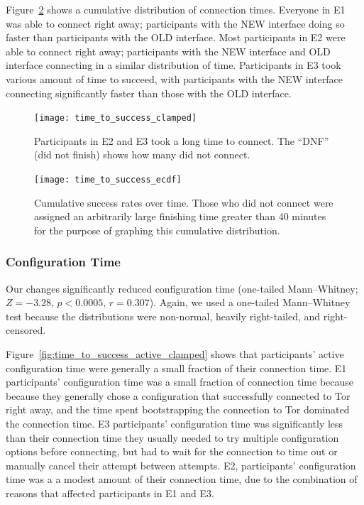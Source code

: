 \documentclass[USenglish,oneside,twocolumn]{article}
\begin{document}
Figure~\ref{fig:time_to_success_ecdf} shows a cumulative distribution of connection times. Everyone in E1 was able to connect right away; participants with the NEW interface doing so faster than participants with the OLD interface. Most participants in E2 were able to connect right away; participants with the NEW interface and OLD interface connecting in a similar distribution of time. Participants in E3 took various amount of time to succeed, with participants with the NEW interface connecting significantly faster than those with the OLD interface. 

\begin{figure}[t]
\centering
\texttt{[image: time\_to\_success\_clamped]}
\caption{
Participants in E2 and E3 took a long time to connect.
The ``DNF'' (did not finish) shows how many did not connect.}
\label{fig:time_to_success_clamped}
\end{figure}

\begin{figure}[t]
\centering
\texttt{[image: time\_to\_success\_ecdf]}
%
\caption{
Cumulative success rates over time. Those who did not connect were assigned an arbitrarily large finishing time greater than 40 minutes for the purpose of graphing this cumulative distribution. 
}
\label{fig:time_to_success_ecdf}
\end{figure}


\subsubsection{Configuration Time} 
Our changes significantly reduced configuration time (one-tailed Mann--Whitney; $Z = -3.28$, $p < 0.0005$, $r = 0.307$). Again, we used a one-tailed Mann--Whitney test because the distributions were non-normal, heavily right-tailed, and right-censored. 

Figure~\ref{fig:time_to_success_active_clamped} shows that participants' active configuration time were generally a small fraction of their connection time. E1 participants' configuration time was a small fraction of connection time because because they generally chose a configuration that successfully connected to Tor right away, and the time spent bootstrapping the connection to Tor dominated the connection time. E3 participants' configuration time was significantly less than their connection time they usually needed to try multiple configuration options before connecting, but had to wait for the connection to time out or manually cancel their attempt between attempts. E2, participants' configuration time was a a modest amount of their connection time, due to the combination of reasons that affected participants in E1 and E3. 
\end{document}
